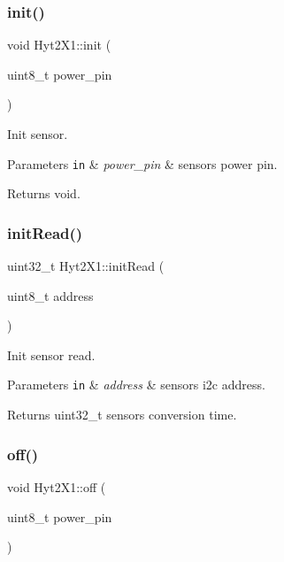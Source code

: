 \subsubsection{\texorpdfstring{init()}{init()}}
{\footnotesize\ttfamily void Hyt2\+X1\+::init (\begin{DoxyParamCaption}\item[{uint8\+\_\+t}]{power\+\_\+pin }\end{DoxyParamCaption})}



Init sensor. 


\begin{DoxyParams}[1]{Parameters}
\mbox{\tt in}  & {\em power\+\_\+pin} & sensors power pin. \\
\hline
\end{DoxyParams}
\begin{DoxyReturn}{Returns}
void. 
\end{DoxyReturn}
\mbox{\label{namespaceHyt2X1_a47e38827f637ac58bbcec76c238de87a}} 
\subsubsection{\texorpdfstring{init\+Read()}{initRead()}}
{\footnotesize\ttfamily uint32\+\_\+t Hyt2\+X1\+::init\+Read (\begin{DoxyParamCaption}\item[{uint8\+\_\+t}]{address }\end{DoxyParamCaption})}



Init sensor read. 


\begin{DoxyParams}[1]{Parameters}
\mbox{\tt in}  & {\em address} & sensors i2c address. \\
\hline
\end{DoxyParams}
\begin{DoxyReturn}{Returns}
uint32\+\_\+t sensors conversion time. 
\end{DoxyReturn}
\mbox{\label{namespaceHyt2X1_ae78eebe12bb6a879bc487ec001416b2e}} 
\subsubsection{\texorpdfstring{off()}{off()}}
{\footnotesize\ttfamily void Hyt2\+X1\+::off (\begin{DoxyParamCaption}\item[{uint8\+\_\+t}]{power\+\_\+pin }\end{DoxyParamCaption})}



